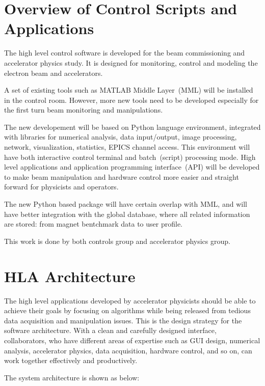 \documentclass[letterpaper,showtrims]{memoir}
\begin{document}
\section{Overview of Control Scripts and Applications}

The high level control software is developed for the beam commissioning
and accelerator physics study. It is designed for monitoring, control and modeling
the electron beam and accelerators.

A set of existing tools such as MATLAB Middle Layer~(MML) will be
installed in the control room. However, more new tools need to be
developed especially for the first turn beam monitoring and manipulations.

The new developement will be based on Python language environment,
integrated with libraries for numerical analysis, data input/output, image
processing, network, visualization, statistics, EPICS channel access. This
environment will have both interactive control terminal and batch~(script)
processing mode. High level applications and application programming
interface~(API) will be developed to make beam manipulation and hardware
control more easier and straight forward for physicists and operators.

The new Python based package will have certain overlap with MML, and will
have better integration with the global database, where all related
information are stored: from magnet bentchmark data to user profile.

This work is done by both controls group and accelerator physics group.

\section{HLA Architecture}

The high level applications developed by accelerator physicists should
be able to achieve their goals by focusing on algorithms while being
released from tedious data acquisition and manipulation issues. This
is the design strategy for the software architecture. With a clean and
carefully designed interface, collaborators, who have different areas
of expertise such as GUI design, numerical analysis, accelerator
physics, data acquisition, hardware control, and so on, can work
together effectively and productively.

The system architecture is shown as below:
\end{document}
